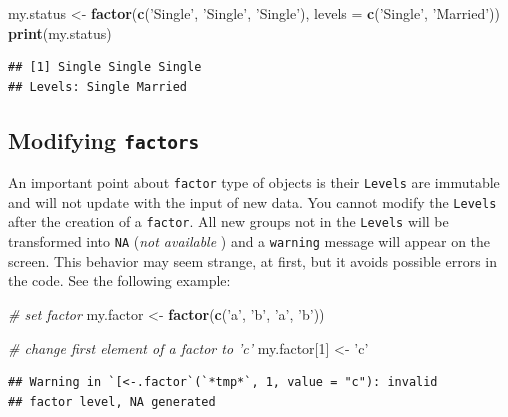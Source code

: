 \documentclass[11pt,]{book}
\newenvironment{Shaded}{\begin{snugshade}}{\end{snugshade}}
\newcommand{\KeywordTok}[1]{\textcolor[rgb]{0.27,0.27,0.27}{\textbf{#1}}}
\newcommand{\DataTypeTok}[1]{\textcolor[rgb]{0.27,0.27,0.27}{#1}}
\newcommand{\DecValTok}[1]{\textcolor[rgb]{0.06,0.06,0.06}{#1}}
\newcommand{\StringTok}[1]{\textcolor[rgb]{0.5,0.5,0.5}{#1}}
\newcommand{\CommentTok}[1]{\textcolor[rgb]{0.56,0.35,0.01}{\textit{#1}}}
\newcommand{\NormalTok}[1]{#1}
\begin{document}
\begin{Shaded}
\begin{Highlighting}[]
\NormalTok{my.status <-}\StringTok{ }\KeywordTok{factor}\NormalTok{(}\KeywordTok{c}\NormalTok{(}\StringTok{'Single'}\NormalTok{, }\StringTok{'Single'}\NormalTok{, }\StringTok{'Single'}\NormalTok{), }
                    \DataTypeTok{levels =} \KeywordTok{c}\NormalTok{(}\StringTok{'Single'}\NormalTok{, }\StringTok{'Married'}\NormalTok{))}
\KeywordTok{print}\NormalTok{(my.status)}
\end{Highlighting}
\end{Shaded}

\begin{verbatim}
## [1] Single Single Single
## Levels: Single Married
\end{verbatim}

\subsection{\texorpdfstring{Modifying
\texttt{factors}}{Modifying factors}}\label{modifying-factors}

An important point about \texttt{factor} type of objects is their
\texttt{Levels} are immutable and will not update with the input of new
data. You cannot modify the \texttt{Levels} after the creation of a
\texttt{factor}. All new groups not in the \texttt{Levels} will be
transformed into \texttt{NA} (\emph{not available} ) and a
\texttt{warning} message will appear on the screen. This behavior may
seem strange, at first, but it avoids possible errors in the code. See
the following example:

\begin{Shaded}
\begin{Highlighting}[]
\CommentTok{# set factor}
\NormalTok{my.factor <-}\StringTok{ }\KeywordTok{factor}\NormalTok{(}\KeywordTok{c}\NormalTok{(}\StringTok{'a'}\NormalTok{, }\StringTok{'b'}\NormalTok{, }\StringTok{'a'}\NormalTok{, }\StringTok{'b'}\NormalTok{))}

\CommentTok{# change first element of a factor to 'c'}
\NormalTok{my.factor[}\DecValTok{1}\NormalTok{] <-}\StringTok{ 'c'}
\end{Highlighting}
\end{Shaded}

\begin{verbatim}
## Warning in `[<-.factor`(`*tmp*`, 1, value = "c"): invalid
## factor level, NA generated
\end{verbatim}
\end{document}
